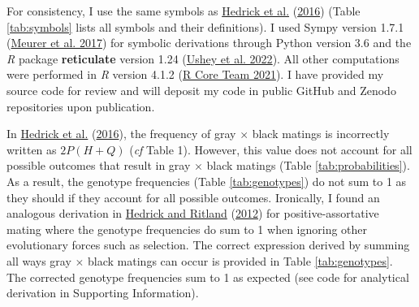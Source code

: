 \documentclass[
]{article}
\begin{document}
For consistency, I use the same symbols as \protect\hyperlink{ref-hedrick_negative-assortative_2016}{Hedrick et al.} (\protect\hyperlink{ref-hedrick_negative-assortative_2016}{2016}) (Table \ref{tab:symbols} lists all symbols and their definitions). I used Sympy version 1.7.1 (\protect\hyperlink{ref-meurer_sympy:_2017}{Meurer et al. 2017}) for symbolic derivations through Python version 3.6 and the \emph{R} package \textbf{reticulate} version 1.24 (\protect\hyperlink{ref-ushey_reticulate_2022}{Ushey et al. 2022}). All other computations were performed in \emph{R} version 4.1.2 (\protect\hyperlink{ref-r_core_team_r_2021}{R Core Team 2021}). I have provided my source code for review and will deposit my code in public GitHub and Zenodo repositories upon publication.

In \protect\hyperlink{ref-hedrick_negative-assortative_2016}{Hedrick et al.} (\protect\hyperlink{ref-hedrick_negative-assortative_2016}{2016}), the frequency of gray \(\times\) black matings is incorrectly written as \(2 P (H + Q)\) (\emph{cf} Table 1). However, this value does not account for all possible outcomes that result in gray \(\times\) black matings (Table \ref{tab:probabilities}). As a result, the genotype frequencies (Table \ref{tab:genotypes}) do not sum to 1 as they should if they account for all possible outcomes. Ironically, I found an analogous derivation in \protect\hyperlink{ref-hedrick_population_2012}{Hedrick and Ritland} (\protect\hyperlink{ref-hedrick_population_2012}{2012}) for positive-assortative mating where the genotype frequencies do sum to 1 when ignoring other evolutionary forces such as selection. The correct expression derived by summing all ways gray \(\times\) black matings can occur is provided in Table \ref{tab:genotypes}. The corrected genotype frequencies sum to 1 as expected (see code for analytical derivation in Supporting Information).
\end{document}
